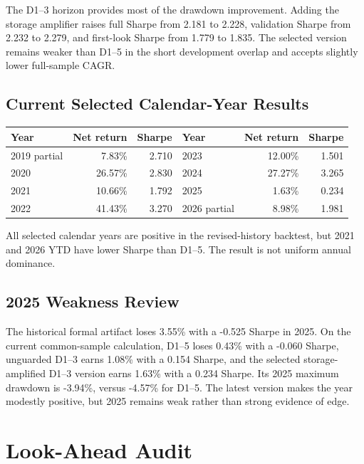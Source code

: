 \documentclass[11pt,a4paper]{article}
\begin{document}
The D1--3 horizon provides most of the drawdown improvement. Adding the
storage amplifier raises full Sharpe from 2.181 to 2.228, validation Sharpe
from 2.232 to 2.279, and first-look Sharpe from 1.779 to 1.835. The selected
version remains weaker than D1--5 in the short development overlap and accepts
slightly lower full-sample CAGR.

\subsection{Current Selected Calendar-Year Results}

\begin{table}[h]
\centering
\begin{tabular}{lrr@{\qquad}lrr}
\toprule
Year & Net return & Sharpe & Year & Net return & Sharpe\\
\midrule
2019 partial & 7.83\% & 2.710 & 2023 & 12.00\% & 1.501\\
2020 & 26.57\% & 2.830 & 2024 & 27.27\% & 3.265\\
2021 & 10.66\% & 1.792 & 2025 & 1.63\% & 0.234\\
2022 & 41.43\% & 3.270 & 2026 partial & 8.98\% & 1.981\\
\bottomrule
\end{tabular}
\end{table}

All selected calendar years are positive in the revised-history backtest,
but 2021 and 2026 YTD have lower Sharpe than D1--5. The result is not uniform
annual dominance.

\subsection{2025 Weakness Review}

The historical formal artifact loses 3.55\% with a -0.525 Sharpe in 2025. On
the current common-sample calculation, D1--5 loses 0.43\% with a -0.060 Sharpe,
unguarded D1--3 earns 1.08\% with a 0.154 Sharpe, and the selected
storage-amplified D1--3 version earns 1.63\% with a 0.234 Sharpe. Its 2025
maximum drawdown is -3.94\%, versus -4.57\% for D1--5. The latest version
makes the year modestly positive, but 2025 remains weak rather than strong
evidence of edge.

\section{Look-Ahead Audit}
\end{document}
